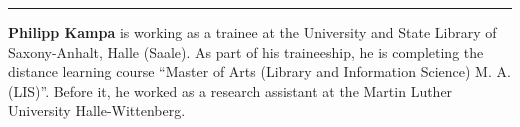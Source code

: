 \begin{center}\rule{0.5\linewidth}{\linethickness}\end{center}

\textbf{Philipp Kampa} is working as a trainee at the University and
State Library of Saxony-Anhalt, Halle (Saale). As part of his
traineeship, he is completing the distance learning course ``Master of
Arts (Library and Information Science) M. A. (LIS)''. Before it, he
worked as a research assistant at the Martin Luther University
Halle-Wittenberg.
